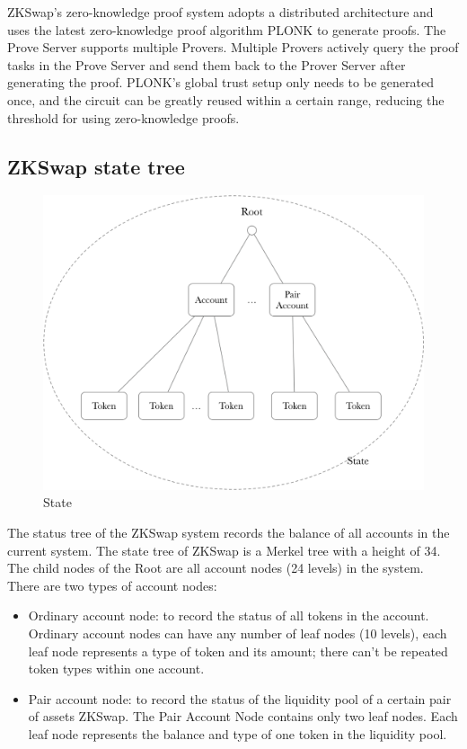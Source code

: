 \documentclass[]{template/llncs}
\begin{document}
ZKSwap's zero-knowledge proof system adopts a distributed architecture and uses the latest zero-knowledge proof algorithm PLONK\cite{cryptoeprint:2019:953} to generate proofs. The Prove Server supports multiple Provers. Multiple Provers actively query the proof tasks in the Prove Server and send them back to the Prover Server after generating the proof. PLONK's global trust setup only needs to be generated once, and the circuit can be greatly reused within a certain range, reducing the threshold for using zero-knowledge proofs.

\subsection{ZKSwap state tree}

\begin{figure}[htbp]
\centering
\includegraphics[width=0.9\columnwidth]{figure/state}
\caption{State}
\label{fig:state}
\end{figure}

The status tree of the ZKSwap system records the balance of all accounts in the current system. The state tree of ZKSwap is a Merkel tree with a height of 34. The child nodes of the Root are all account nodes (24 levels) in the system. There are two types of account nodes: 


\begin{itemize}
	\item Ordinary account node: to record the status of all tokens in the account. Ordinary account nodes can have any number of leaf nodes (10 levels), each leaf node represents a type of token and its amount; there can’t be repeated token types within one account.
	\item Pair account node: to record the status of the liquidity pool of a certain pair of assets ZKSwap. The Pair Account Node contains only two leaf nodes. Each leaf node represents the balance and type of one token in the liquidity pool.
\end{itemize}
\end{document}
